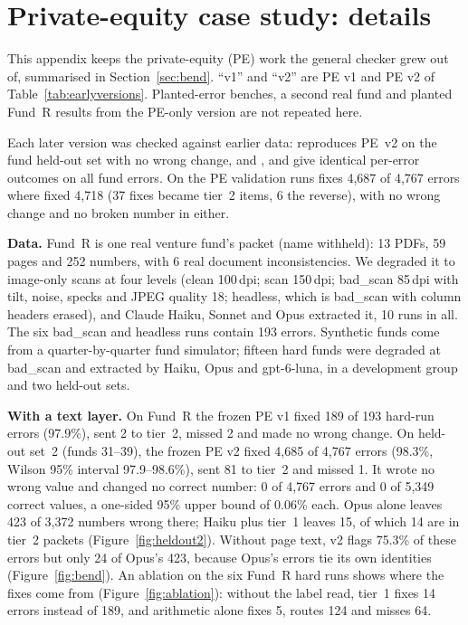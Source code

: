 \clearpage
\onecolumn
\appendix
{}
\newcommand{\apptab}[1]{\par\Needspace{22\baselineskip}\medskip\noindent\captionof{table}{#1}}
\small
\setlength{\tabcolsep}{5pt}

\section{Private-equity case study: details}\label{app:pe}
This appendix keeps the private-equity (PE) work the general checker grew out of, summarised in Section~\ref{sec:bend}. ``v1'' and ``v2'' are PE v1 and PE v2 of Table~\ref{tab:earlyversions}. Planted-error benches, a second real fund and planted Fund~R results from the PE-only version are not repeated here.

Each later version was checked against earlier data: \vq{} reproduces PE~v2 on the fund held-out set with no wrong change, and ,  and  give identical per-error outcomes on all fund errors. On the PE validation runs  fixes 4,687 of 4,767 errors where  fixed 4,718 (37 fixes became tier~2 items, 6 the reverse), with no wrong change and no broken number in either.

\textbf{Data.} Fund~R is one real venture fund's packet (name withheld): 13 PDFs, 59 pages and 252 numbers, with 6 real document inconsistencies. We degraded it to image-only scans at four levels (clean 100\,dpi; scan 150\,dpi; bad\_scan 85\,dpi with tilt, noise, specks and JPEG quality 18; headless, which is bad\_scan with column headers erased), and Claude Haiku, Sonnet and Opus extracted it, 10 runs in all. The six bad\_scan and headless runs contain 193 errors. Synthetic funds come from a quarter-by-quarter fund simulator; fifteen hard funds were degraded at bad\_scan and extracted by Haiku, Opus and gpt-6-luna, in a development group and two held-out sets.

\textbf{With a text layer.} On Fund~R the frozen PE v1 fixed 189 of 193 hard-run errors (97.9\%), sent 2 to tier~2, missed 2 and made no wrong change. On held-out set~2 (funds 31--39), the frozen PE v2 fixed 4,685 of 4,767 errors (98.3\%, Wilson 95\% interval 97.9--98.6\%), sent 81 to tier~2 and missed 1. It wrote no wrong value and changed no correct number: 0 of 4,767 errors and 0 of 5,349 correct values, a one-sided 95\% upper bound of 0.06\% each. Opus alone leaves 423 of 3,372 numbers wrong there; Haiku plus tier~1 leaves 15, of which 14 are in tier~2 packets (Figure~\ref{fig:heldout2}). Without page text, v2 flags 75.3\% of these errors but only 24 of Opus's 423, because Opus's errors tie its own identities (Figure~\ref{fig:bend}). An ablation on the six Fund~R hard runs shows where the fixes come from (Figure~\ref{fig:ablation}): without the label read, tier~1 fixes 14 errors instead of 189, and arithmetic alone fixes 5, routes 124 and misses 64.


